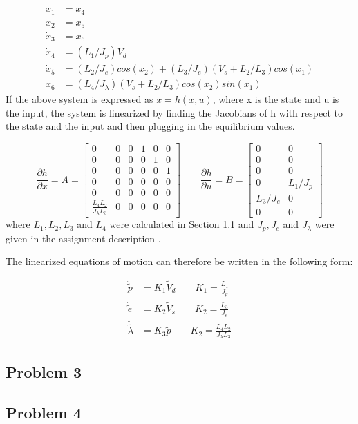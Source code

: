 \begin{subequations}
  \begin{align}
    \dot{x}_1 &= x_4 \\
    \dot{x}_2 &= x_5 \\
    \dot{x}_3 &= x_6 \\
    \dot{x}_4 &= (L_1/J_p) V_d \\
    \dot{x}_5 &= (L_2/J_e)cos(x_2) + (L_3/J_e)(V_s + L_2 / L_3)cos(x_1) \\
    \dot{x}_6 &= (L_4 / J_\lambda) (V_s + L_2 / L_3)cos(x_2)sin(x_1)
  \end{align}
\end{subequations}
If the above system is expressed as $\dot{x} = h(x, u)$, where x is
the state and u is the input, the system is linearized by finding the
Jacobians of h with respect to the state and the input and then
plugging in the equilibrium values.

\begin{equation}
  \frac{\partial h}{\partial x} = A =
  \begin{bmatrix}
    0 & 0 & 0 & 1 & 0 & 0 \\
    0 & 0 & 0 & 0 & 1 & 0 \\
    0 & 0 & 0 & 0 & 0 & 1 \\
    0 & 0 & 0 & 0 & 0 & 0 \\
    0 & 0 & 0 & 0 & 0 & 0 \\
    \frac{L_4L_2}{J_\lambda L_3} & 0 & 0 & 0 & 0 & 0
  \end{bmatrix}
  \qquad
  \frac{\partial h}{\partial u} = B =
  \begin{bmatrix}
    0 & 0 \\
    0 & 0 \\
    0 & 0 \\
    0 & L_1/J_p \\
    L_3/J_e & 0 \\
    0 & 0
  \end{bmatrix}
\end{equation}
where $L_1, L_2, L_3$ and $L_4$ were calculated in Section 1.1
 and $J_p, J_e$ and $J_\lambda$ were given in
the assignment description .

The linearized equations of motion can therefore be written in the
following form:

\begin{subequations}
  \begin{align}
    \ddot{\tilde{p}} &= K_1\tilde{V}_d \qquad K_1 = \frac{L_1}{J_p}\\
    \ddot{\tilde{e}} &= K_2\tilde{V}_s \qquad K_2 = \frac{L_3}{J_e}\\
    \ddot{\tilde{\lambda}} &= K_3\tilde{p} \qquad K_2 = \frac{L_4L_2}{J_\lambda L_3}
  \end{align}
\end{subequations}
\subsection{Problem 3}
\subsection{Problem 4}
